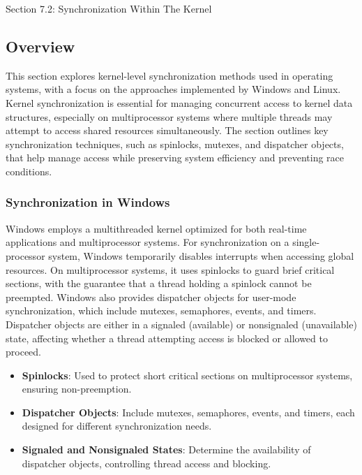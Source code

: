 \begin{notes}{Section 7.2: Synchronization Within The Kernel}
    \subsection*{Overview}

    This section explores kernel-level synchronization methods used in operating systems, with a focus on the approaches implemented by Windows and Linux. Kernel synchronization is essential for 
    managing concurrent access to kernel data structures, especially on multiprocessor systems where multiple threads may attempt to access shared resources simultaneously. The section outlines 
    key synchronization techniques, such as spinlocks, mutexes, and dispatcher objects, that help manage access while preserving system efficiency and preventing race conditions.
    
    \subsubsection*{Synchronization in Windows}
    
    Windows employs a multithreaded kernel optimized for both real-time applications and multiprocessor systems. For synchronization on a single-processor system, Windows temporarily disables interrupts 
    when accessing global resources. On multiprocessor systems, it uses spinlocks to guard brief critical sections, with the guarantee that a thread holding a spinlock cannot be preempted. Windows also 
    provides dispatcher objects for user-mode synchronization, which include mutexes, semaphores, events, and timers. Dispatcher objects are either in a signaled (available) or nonsignaled (unavailable) 
    state, affecting whether a thread attempting access is blocked or allowed to proceed.
    
    \begin{highlight}
    
        \begin{itemize}
            \item \textbf{Spinlocks}: Used to protect short critical sections on multiprocessor systems, ensuring non-preemption.
            \item \textbf{Dispatcher Objects}: Include mutexes, semaphores, events, and timers, each designed for different synchronization needs.
            \item \textbf{Signaled and Nonsignaled States}: Determine the availability of dispatcher objects, controlling thread access and blocking.
        \end{itemize}
    

\end{highlight}
\end{notes}
